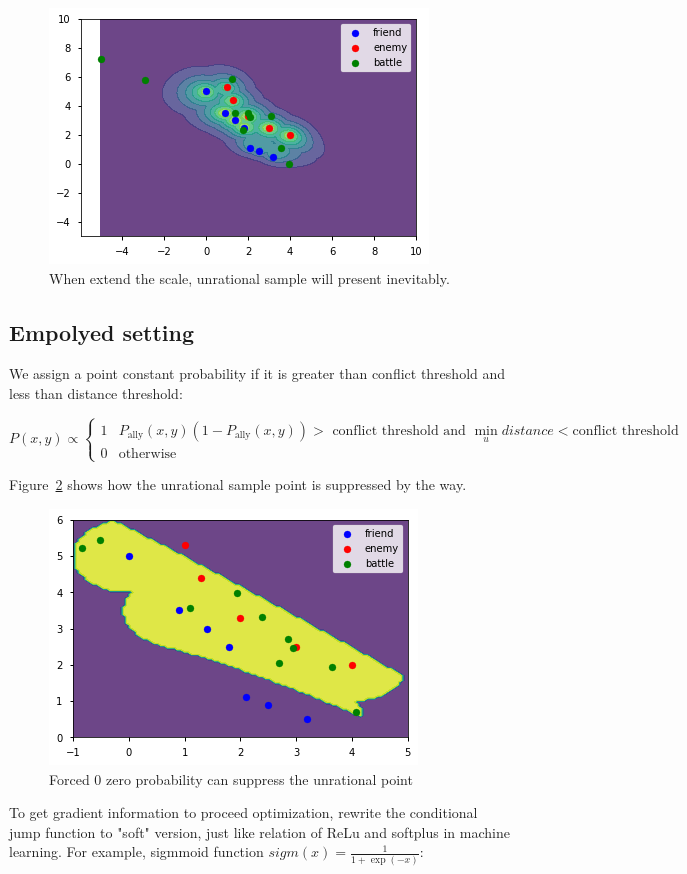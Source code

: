 \documentclass{article}
\begin{document}
\begin{figure}[h]
\includegraphics[width=0.6\linewidth]{comb4.png}
\caption{When extend the scale, unrational sample will present inevitably.}
\label{fig:combThree}
\end{figure}

\subsection{Empolyed setting}

We assign a point constant probability 
if it is greater than conflict threshold and less than distance threshold:

$$
P(x,y) \propto
\begin{cases}
1 & P_\text{ally}(x,y) (1-P_\text{ally}(x,y)) > \text{ conflict threshold and }
    \min_{u} distance < \text{conflict threshold} \\
0 & \text{otherwise}
\end{cases}
$$

Figure~\ref{fig:combFive} shows how the unrational sample point is suppressed by the way.

\begin{figure}[h]
\includegraphics[width=0.6\linewidth]{comb5.png}
\caption{Forced 0 zero probability can suppress the unrational point}
\label{fig:combFive}
\end{figure}

To get gradient information to proceed optimization, 
rewrite the conditional jump function to "soft" version, 
just like relation of ReLu and softplus in machine learning. 
For example, sigmmoid function $sigm(x) = \frac{1}{1+\exp(-x)}$:
\end{document}
